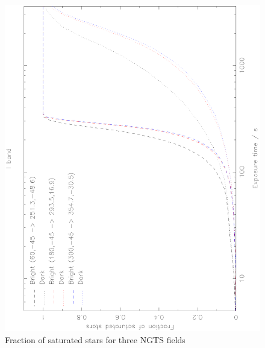 \documentclass[11pt,a4paper]{report}
\begin{document}
\begin{figure}
    \begin{center}
        \includegraphics[angle=270,width=0.9\columnwidth]{images/fractionsaturated}
    \end{center}
    \caption{Fraction of saturated stars for three NGTS fields}
    \label{fig:fractionsaturated}
\end{figure}
\end{document}
